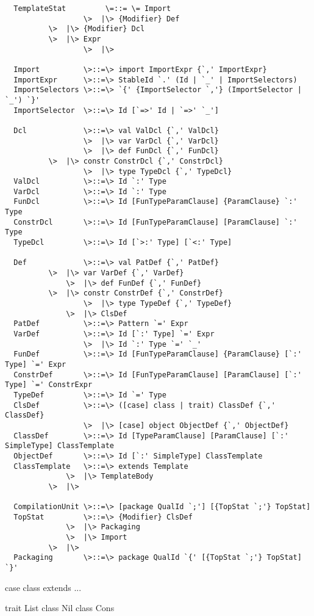 \documentclass[11pt]{report}
\begin{document}
\begin{verbatim}
  TemplateStat         \=::= \= Import
                  \>  |\> {Modifier} Def
		  \>  |\> {Modifier} Dcl
		  \>  |\> Expr
                  \>  |\>

  Import          \>::=\> import ImportExpr {`,' ImportExpr}
  ImportExpr      \>::=\> StableId `.' (Id | `_' | ImportSelectors)
  ImportSelectors \>::=\> `{' {ImportSelector `,'} (ImportSelector | `_') `}'
  ImportSelector  \>::=\> Id [`=>' Id | `=>' `_']

  Dcl             \>::=\> val ValDcl {`,' ValDcl}
                  \>  |\> var VarDcl {`,' VarDcl}
                  \>  |\> def FunDcl {`,' FunDcl}
		  \>  |\> constr ConstrDcl {`,' ConstrDcl}
                  \>  |\> type TypeDcl {`,' TypeDcl}
  ValDcl          \>::=\> Id `:' Type
  VarDcl          \>::=\> Id `:' Type
  FunDcl          \>::=\> Id [FunTypeParamClause] {ParamClause} `:' Type
  ConstrDcl       \>::=\> Id [FunTypeParamClause] [ParamClause] `:' Type
  TypeDcl         \>::=\> Id [`>:' Type] [`<:' Type]

  Def             \>::=\> val PatDef {`,' PatDef}
		  \>  |\> var VarDef {`,' VarDef}
  	          \>  |\> def FunDef {`,' FunDef}
		  \>  |\> constr ConstrDef {`,' ConstrDef}
                  \>  |\> type TypeDef {`,' TypeDef}
	          \>  |\> ClsDef
  PatDef          \>::=\> Pattern `=' Expr
  VarDef          \>::=\> Id [`:' Type] `=' Expr
                  \>  |\> Id `:' Type `=' `_'
  FunDef          \>::=\> Id [FunTypeParamClause] {ParamClause} [`:' Type] `=' Expr
  ConstrDef       \>::=\> Id [FunTypeParamClause] [ParamClause] [`:' Type] `=' ConstrExpr
  TypeDef         \>::=\> Id `=' Type
  ClsDef          \>::=\> ([case] class | trait) ClassDef {`,' ClassDef}
                  \>  |\> [case] object ObjectDef {`,' ObjectDef}
  ClassDef        \>::=\> Id [TypeParamClause] [ParamClause] [`:' SimpleType] ClassTemplate
  ObjectDef       \>::=\> Id [`:' SimpleType] ClassTemplate
  ClassTemplate   \>::=\> extends Template
	          \>  |\> TemplateBody
		  \>  |\>

  CompilationUnit \>::=\> [package QualId `;'] [{TopStat `;'} TopStat]
  TopStat         \>::=\> {Modifier} ClsDef
	          \>  |\> Packaging
	          \>  |\> Import
		  \>  |\>
  Packaging       \>::=\> package QualId `{' [{TopStat `;'} TopStat] `}'
\end{verbatim}

case class extends { ... }

trait List { }
class Nil
class Cons

\end{document}
